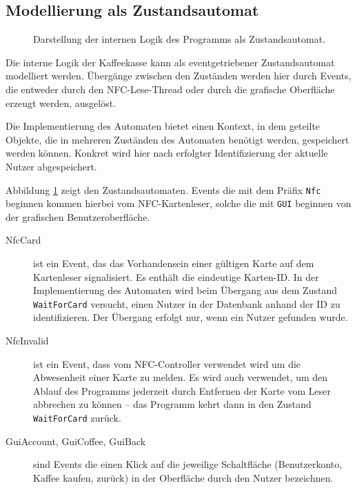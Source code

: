 \documentclass[11pt,a4paper]{IEEEtran}
\begin{document}
\subsection{Modellierung als Zustandsautomat}

\begin{figure}[ht!]
    \centering
    
    \caption{Darstellung der internen Logik des Programms als Zustandsautomat.}
    \label{fig:statemachine}
\end{figure}

Die interne Logik der Kaffeekasse kann als eventgetriebener Zustandsautomat 
modelliert werden. Übergänge zwischen den Zuständen werden hier durch Events,
die entweder durch den NFC-Lese-Thread oder durch die grafische Oberfläche
erzeugt werden, ausgelöst. 

Die Implementierung des Automaten bietet einen Kontext, in dem geteilte
Objekte, die in mehreren Zuständen des Automaten benötigt werden, gespeichert 
werden können. Konkret wird hier nach erfolgter Identifizierung der aktuelle
Nutzer abgespeichert.

Abbildung \ref{fig:statemachine} zeigt den Zustandsautomaten. Events die
mit dem Präfix \texttt{Nfc} beginnen kommen hierbei vom NFC-Kartenleser, solche
die mit \texttt{GUI} beginnen von der grafischen Benutzeroberfläche. 

\begin{description}
    \item[NfcCard] ist ein Event, das das Vorhandensein einer gültigen
        Karte auf dem Kartenleser signalisiert. Es enthält die eindeutige 
        Karten-ID. In der Implementierung des Automaten wird beim Übergang aus
        dem Zustand \texttt{WaitForCard} versucht, einen Nutzer in der
        Datenbank anhand der ID zu identifizieren. Der Übergang erfolgt nur,
        wenn ein Nutzer gefunden wurde.
    \item[NfcInvalid] ist ein Event, dass vom NFC-Controller verwendet wird
        um die Abwesenheit einer Karte zu melden. Es wird auch verwendet, um 
        den Ablauf des Programms jederzeit durch Entfernen der Karte vom Leser
        abbrechen zu können -- das Programm kehrt dann in den Zustand
        \texttt{WaitForCard} zurück.
    \item[GuiAccount, GuiCoffee, GuiBack] sind Events die einen Klick auf die
        jeweilige Schaltfläche (Benutzerkonto, Kaffee kaufen, zurück) in der 
        Oberfläche durch den Nutzer bezeichnen.
\end{description}
\end{document}
